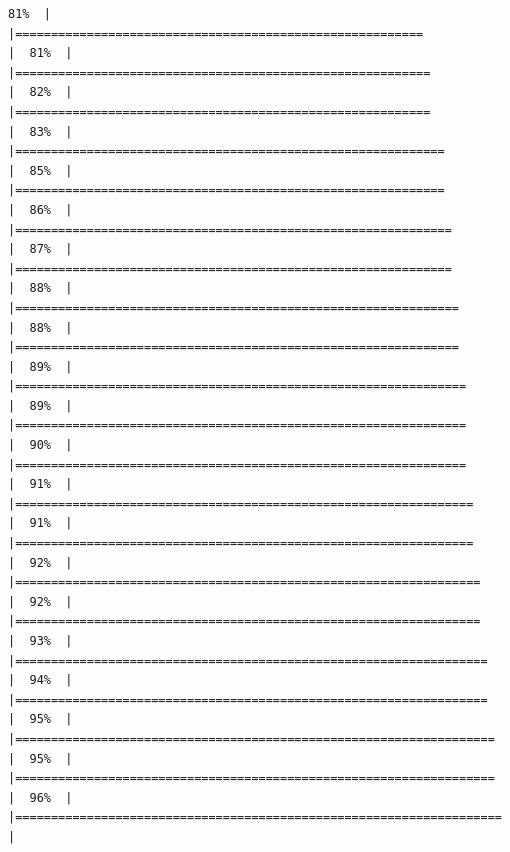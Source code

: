 \documentclass[
  english,
  man,a4paper,mask,floatsintext]{apa6}
\begin{document}
\begin{verbatim}
81%  |                                                                              |=========================================================             |  81%  |                                                                              |==========================================================            |  82%  |                                                                              |==========================================================            |  83%  |                                                                              |============================================================          |  85%  |                                                                              |============================================================          |  86%  |                                                                              |=============================================================         |  87%  |                                                                              |=============================================================         |  88%  |                                                                              |==============================================================        |  88%  |                                                                              |==============================================================        |  89%  |                                                                              |===============================================================       |  89%  |                                                                              |===============================================================       |  90%  |                                                                              |===============================================================       |  91%  |                                                                              |================================================================      |  91%  |                                                                              |================================================================      |  92%  |                                                                              |=================================================================     |  92%  |                                                                              |=================================================================     |  93%  |                                                                              |==================================================================    |  94%  |                                                                              |==================================================================    |  95%  |                                                                              |===================================================================   |  95%  |                                                                              |===================================================================   |  96%  |                                                                              |====================================================================  |  
\end{verbatim}
\end{document}
